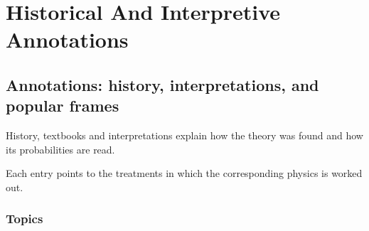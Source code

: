 \documentclass[11pt,oneside]{book}
\begin{document}
\part{Historical And Interpretive Annotations}

\chapter{Annotations: history, interpretations, and popular frames}

History, textbooks and interpretations explain how the theory was found and how its probabilities are read.

Each entry points to the treatments in which the corresponding physics is worked out.

\section*{Topics}
\end{document}
